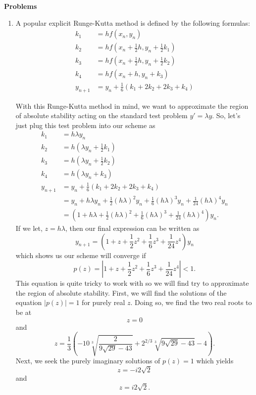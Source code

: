 \documentclass[a4paper,12pt]{article}
\newcommand{\abs}[1]{\left| #1 \right|}
\begin{document}
\textbf{Problems}
\begin{enumerate}[label = (\arabic*)]
	\item A popular explicit Runge-Kutta method is defined by the following formulas:
	\begin{align*}
		k_1 		 &= hf(x_n, y_n) \\
		k_2 		 &= hf(x_n + \frac{1}{2}h, y_n + \frac{1}{2} k_1) \\
		k_3 		 &= hf(x_n + \frac{1}{2}h, y_n + \frac{1}{2}k_2) \\
		k_4          &= hf(x_n + h, y_n + k_3) \\
		y_{n + 1} &= y_n + \frac{1}{6} (k_1 + 2k_2 + 2k_3 + k_4)
	\end{align*}
	
	With this Runge-Kutta method in mind, we want to approximate the region of absolute stability acting on the standard test problem $ y' = \lambda y $. So, let's just plug this test problem into our scheme as
	\begin{align*}
		k_1 		 &= h \lambda y_n \\
		k_2          &= h(\lambda y_n + \frac{1}{2} k_1) \\
		k_3 		 &= h(\lambda y_n + \frac{1}{2} k_2) \\
		k_4          &= h(\lambda y_n + k_3) \\
		y_{n + 1} &= y_n + \frac{1}{6} (k_1 + 2k_2 + 2k_3 + k_4) \\
						&= y_n + h \lambda y_n + \frac{1}{2} (h \lambda)^2 y_n + \frac{1}{6} (h \lambda)^3 y_n + \frac{1}{24} (h \lambda)^4 y_n \\
					    &= \left(1 + h \lambda + \frac{1}{2} (h \lambda)^2 + \frac{1}{6} (h \lambda)^3 + \frac{1}{24} (h \lambda)^4 \right) y_n.
	\end{align*}
	If we let, $ z = h \lambda $, then our final expression can be written as
	\[
		y_{n + 1} = \left(1 + z + \frac{1}{2} z^2 + \frac{1}{6} z^3 + \frac{1}{24} z^4 \right) y_n
	\]
	which shows us our scheme will converge if
	\[
		p(z) = \abs{1 + z + \frac{1}{2} z^2 + \frac{1}{6} z^3 + \frac{1}{24} z^4} < 1.
	\]
	This equation is quite tricky to work with so we will find try to approximate the region of absolute stability. First, we will find the solutions of the equation $ \abs{p(z)} = 1$ for purely real $ z $. Doing so, we find the two real roots to be at
	\[
		z = 0
	\]
	and 
	\[
		z = \frac{1}{3} \left(-10 \sqrt[3]{\frac{2}{9 \sqrt{29}-43}}+2^{2/3} \sqrt[3]{9 \sqrt{29}-43}-4\right).
	\]
	Next, we seek the purely imaginary solutions of $ p(z) = 1 $ which yields
	\[
		z = - i 2 \sqrt{2}
	\]
	and 
	\[
		z = i 2 \sqrt{2}.
	\]
	

\end{enumerate}
\end{document}

